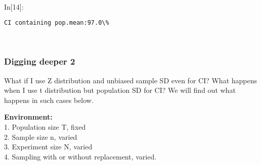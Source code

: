 \documentclass[float=false,crop=false]{standalone}
\begin{document}
    
    \begin{center}
    \end{center}
    { \hspace*{\fill} \\}
    \begin{InVerbatim}[commandchars=\\\{\},fontsize=\scriptsize]
{\color{incolor}In[{\color{incolor}14}]:}    
         
             
         
           
\end{InVerbatim}
    \begin{Verbatim}[commandchars=\\\{\},fontsize=\footnotesize]
CI containing pop.mean:97.0\%

    \end{Verbatim}

    \begin{center}
    \end{center}
    { \hspace*{\fill} \\}
    
    \subsubsection{Digging deeper 2}\label{digging-deeper-2}

What if I use Z distribution and unbiased sample SD even for CI? What
happens when I use t distribution but population SD for CI? We will find
out what happens in such cases below.

\textbf{Environment:}\\
1. Population size T, fixed\\
2. Sample size n, varied\\
3. Experiment size N, varied\\
4. Sampling with or without replacement, varied.
\end{document}
